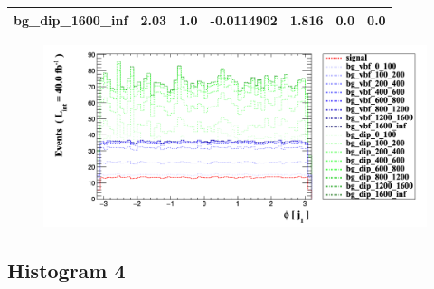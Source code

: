 \documentclass[a4paper, 10pt]{article}
\begin{document}
\begin{table}[H]
\begin{center}
\begin{tabular}{|m{23.0mm}|m{23.0mm}|m{18.0mm}|m{19.0mm}|m{19.0mm}|m{19.0mm}|m{19.0mm}|}
      \hline
      {\cellcolor{white}         bg\_dip\_1600\_inf}& {\cellcolor{white}         2.03}& {\cellcolor{white}         1.0}& {\cellcolor{white}         -0.0114902}& {\cellcolor{white}         1.816}& {\cellcolor{green}         0.0}& {\cellcolor{green}         0.0}\\
\hline
    \end{tabular}
  \end{center}
\end{table}

\begin{figure}[H]
  \begin{center}
    \includegraphics[scale=0.45]{selection_2.png}\\
\caption{   }
  \end{center}
\end{figure}
      \newpage
\subsection{ Histogram 4}
\end{document}
